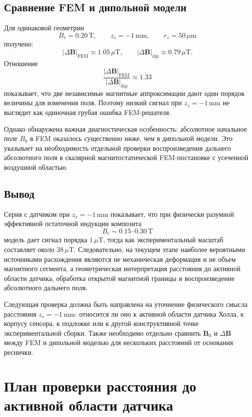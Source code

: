 \documentclass[12pt,a4paper]{article}
\begin{document}
\subsection*{Сравнение FEM и дипольной модели}

Для одинаковой геометрии
\[
    B_r=0.20\,\mathrm{T},\qquad
    z_s=-1\,\mathrm{mm},\qquad
    r_s=50\,\mu\mathrm{m}
\]
получено:
\[
    |\Delta\mathbf B|_{\mathrm{FEM}}
    \approx 1.05\,\mu\mathrm{T},
    \qquad
    |\Delta\mathbf B|_{\mathrm{dip}}
    \approx 0.79\,\mu\mathrm{T}.
\]
Отношение
\[
    \frac{|\Delta\mathbf B|_{\mathrm{FEM}}}
         {|\Delta\mathbf B|_{\mathrm{dip}}}
    \approx 1.33
\]
показывает, что две независимые магнитные аппроксимации дают один порядок
величины для изменения поля. Поэтому низкий сигнал при \(z_s=-1\,\mathrm{mm}\)
не выглядит как одиночная грубая ошибка FEM-решателя.

Однако обнаружена важная диагностическая особенность: абсолютное начальное
поле \(B_0\) в FEM оказалось существенно ниже, чем в дипольной модели. Это
указывает на необходимость отдельной проверки воспроизведения дальнего
абсолютного поля в скалярной магнитостатической FEM-постановке с усеченной
воздушной областью.

\subsection*{Вывод}

Серия с датчиком при \(z_s=-1\,\mathrm{mm}\) показывает, что при физически
разумной эффективной остаточной индукции композита
\[
    B_r\sim 0.15\text{--}0.30\,\mathrm{T}
\]
модель дает сигнал порядка \(1\,\mu\mathrm{T}\), тогда как экспериментальный
масштаб составляет около \(38\,\mu\mathrm{T}\). Следовательно, на текущем
этапе наиболее вероятными источниками расхождения являются не механическая
деформация и не объем магнитного сегмента, а геометрическая интерпретация
расстояния до активной области датчика, обработка открытой магнитной границы
и воспроизведение абсолютного дальнего поля.

Следующая проверка должна быть направлена на уточнение физического смысла
расстояния \(z_s=-1\,\mathrm{mm}\): относится ли оно к активной области
датчика Холла, к корпусу сенсора, к подложке или к другой конструктивной
точке экспериментальной сборки. Также необходимо отдельно сравнить
\(\mathbf B_0\) и \(\Delta\mathbf B\) между FEM и дипольной моделью для
нескольких расстояний от основания реснички.

\section{План проверки расстояния до активной области датчика}
\end{document}
